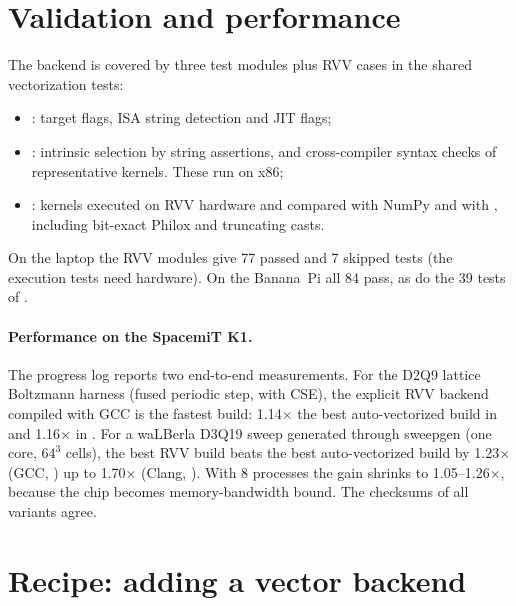 \section{Validation and performance}

The backend is covered by three test modules plus RVV cases in the shared vectorization
tests:
\begin{itemize}
  \item {}: target flags, ISA string detection and
        JIT flags;
  \item {}: intrinsic selection by string
        assertions, and cross-compiler syntax checks of representative kernels. These
        run on x86;
  \item {}: kernels executed on RVV hardware and
        compared with NumPy and with , including bit-exact Philox and
        truncating casts.
\end{itemize}
On the laptop the RVV modules give 77 passed and 7 skipped tests (the execution tests
need hardware). On the Banana~Pi all 84 pass, as do the 39 tests of
.

\paragraph{Performance on the SpacemiT K1.}
The progress log reports two end-to-end measurements. For the D2Q9 lattice Boltzmann
harness  (fused periodic step, with
CSE), the explicit RVV backend compiled with GCC is the fastest build: 1.14$\times$ the
best auto-vectorized build in  and 1.16$\times$ in . For a
waLBerla D3Q19 sweep generated through sweepgen (one core, $64^3$ cells), the best RVV
build beats the best auto-vectorized build by 1.23$\times$ (GCC, ) up to
1.70$\times$ (Clang, ). With 8 processes the gain shrinks to
1.05--1.26$\times$, because the chip becomes memory-bandwidth bound. The 
checksums of all variants agree.

\section{Recipe: adding a vector backend}\label{r01:sec:new-backend}

